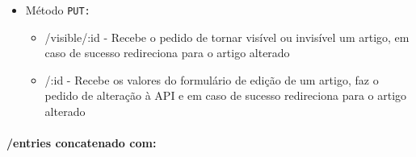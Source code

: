 \begin{itemize}
\begin{itemize}
        \end{itemize}
    \item Método \texttt{PUT:}
        \begin{itemize}
            \item /visible/:id - Recebe o pedido de tornar visível ou invisível um artigo, em caso de sucesso redireciona para o artigo alterado
            \item /:id - Recebe os valores do formulário de edição de um artigo, faz o pedido de alteração à API e em caso de sucesso redireciona para o artigo alterado
        \end{itemize}
\end{itemize}

\paragraph{/entries concatenado com:}
